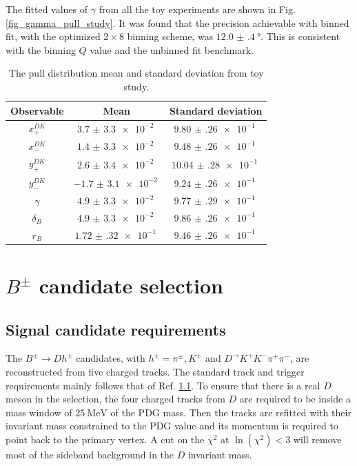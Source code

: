 \documentclass[12pt, a4paper, notitlepage, onecolumn]{article}
\numberwithin{equation}{section}
\begin{document}
The fitted values of $\gamma$ from all the toy experiments are shown in Fig. \ref{fig_gamma_pull_study}. It was found that the precision achievable with binned fit, with the optimized $2\times 8$ binning scheme, was $\SI{12.0(4)}{\degree}$. This is consistent with the binning $Q$ value and the unbinned fit benchmark.

\begin{table}[H]
  \centering
  \caption{The pull distribution mean and standard deviation from toy study.}
  \label{table_pull_study}
  \begin{tabular}{ccc} 
    \toprule
    Observable & Mean                 & Standard deviation \\
    \toprule
    $x_+^{DK}$ & $\SI{3.7(33)e-2}{}$  & $\SI{9.80(26)e-1}{}$ \\
    $x_-^{DK}$ & $\SI{1.4(33)e-2}{}$  & $\SI{9.48(26)e-1}{}$ \\
    $y_+^{DK}$ & $\SI{2.6(34)e-2}{}$  & $\SI{10.04(28)e-1}{}$ \\
    $y_-^{DK}$ & $\SI{-1.7(31)e-2}{}$ & $\SI{9.24(26)e-1}{}$ \\
    $\gamma$   & $\SI{4.9(33)e-2}{}$ & $\SI{9.77(29)e-1}{}$ \\
    $\delta_B$ & $\SI{4.9(33)e-2}{}$ & $\SI{9.86(26)e-1}{}$ \\
    $r_B$      & $\SI{1.72(32)e-1}{}$ & $\SI{9.46(26)e-1}{}$ \\
    \bottomrule
  \end{tabular}
\end{table}

\section{\texorpdfstring{$B^\pm$}{B} candidate selection}
\subsection{Signal candidate requirements}
\noindent The $B^\pm\to Dh^\pm$ candidates, with $h^\pm = \pi^\pm, K^\pm$ and $D^\to K^+K^-\pi^+\pi^-$, are reconstructed from five charged tracks. The standard track and trigger requirements mainly follows that of Ref. \ref{}. To ensure that there is a real $D$ meson in the selection, the four charged tracks from $D$ are required to be inside a mass window of $\SI{25}{\mega\eV}$ of the PDG mass. Then the tracks are refitted with their invariant mass constrained to the PDG value and its momentum is required to point back to the primary vertex. A cut on the $\chi^2$ at $\ln(\chi^2) < 3$ will remove most of the sideband background in the $D$ invariant mass.
\end{document}
